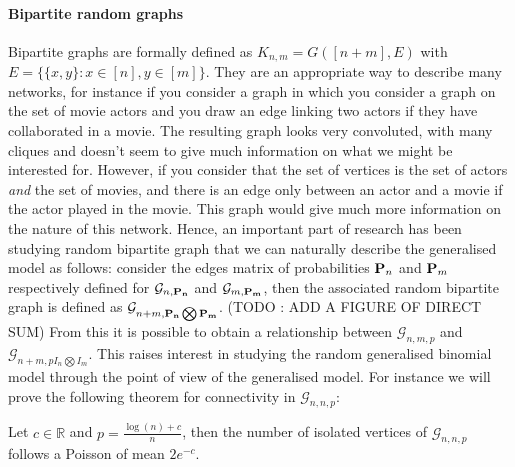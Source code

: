 \paragraph{Bipartite random graphs}
Bipartite graphs are formally defined as $K_{n,m} = G([n+m], E)$ with $E=\{\{x,y\} : x\in[n], y\in[m]\}$.
They are an appropriate way to describe many networks, for instance if you consider a graph in which you consider a graph on the set of movie actors and you draw an edge linking two actors if they have collaborated in a movie.
The resulting graph looks very convoluted, with many cliques and doesn't seem to give much information on what we might be interested for.
However, if you consider that the set of vertices is the set of actors \emph{and} the set of movies, and there is an edge only between an actor and a movie if the actor played in the movie.
This graph would give much more information on the nature of this network.
\newline
Hence, an important part of research has been studying random bipartite graph that we can naturally describe the generalised model as follows:
consider the edges matrix of probabilities $\bold{P}_n$ and $\bold{P}_m$ respectively defined for $\mathcal{G}_{n, \bold{P_n}}$ and $\mathcal{G}_{m, \bold{P_m}}$,
then the associated random bipartite graph is defined as $\mathcal{G}_{n+m, \bold{P_n}\bigotimes \bold{P_m}}$.
(TODO : ADD A FIGURE OF DIRECT SUM)
From this it is possible to obtain a relationship between $\mathcal{G}_{n,m,p}$ and $\mathcal{G}_{n+m,pI_n\bigotimes I_m}$.
This raises interest in studying the random generalised binomial model through the point of view of the generalised model.
For instance we will prove the following theorem for connectivity in $\mathcal{G}_{n,n,p}$:
\begin{theorem}
	Let $c\in \mathbb{R}$ and $p=\frac{\log(n) + c}{n}$, then the number of isolated vertices of $\mathcal{G}_{n,n,p}$  follows a Poisson of mean $2e^{-c}$.
\end{theorem}
